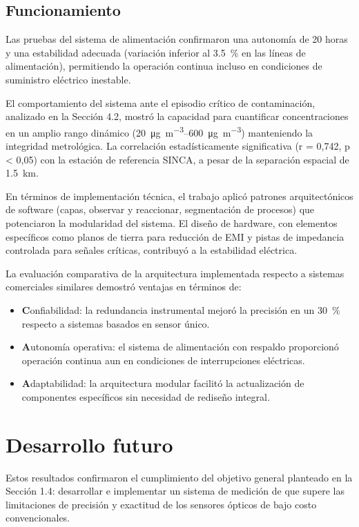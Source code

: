 \subsection*{Funcionamiento}
Las pruebas del sistema de alimentación confirmaron una autonomía de 20 horas y una estabilidad adecuada (variación inferior al \SI{3.5}{\percent} en las líneas de alimentación), permitiendo la operación continua incluso en condiciones de suministro eléctrico inestable.

El comportamiento del sistema ante el episodio crítico de contaminación, analizado en la Sección 4.2, mostró la capacidad para cuantificar concentraciones en un amplio rango dinámico (\SIrange{20}{600}{\micro\gram\per\cubic\meter}) manteniendo la integridad metrológica. La correlación estadísticamente significativa (r = 0,742, p < 0,05) con la estación de referencia SINCA, a pesar de la separación espacial de \SI{1.5}{\kilo\meter}.

En términos de implementación técnica, el trabajo aplicó patrones arquitectónicos de software (capas, observar y reaccionar, segmentación de procesos) que potenciaron la modularidad del sistema. El diseño de hardware, con elementos específicos como planos de tierra para reducción de EMI y pistas de impedancia controlada para señales críticas, contribuyó a la estabilidad eléctrica.

La evaluación comparativa de la arquitectura implementada respecto a sistemas comerciales similares demostró ventajas en términos de:

\begin{itemize}
	\item \textbf Confiabilidad: la redundancia instrumental mejoró la precisión en un \SI{30}{\percent} respecto a sistemas basados en sensor único.
	\item \textbf Autonomía operativa: el sistema de alimentación con respaldo proporcionó operación continua aun en condiciones de interrupciones eléctricas.
	\item \textbf Adaptabilidad: la arquitectura modular facilitó la actualización de componentes específicos sin necesidad de rediseño integral.
\end{itemize}

\section{Desarrollo futuro}

Estos resultados confirmaron el cumplimiento del objetivo general planteado en la Sección 1.4: desarrollar e implementar un sistema de medición de \MPF que supere las limitaciones de precisión y exactitud de los sensores ópticos de bajo costo convencionales.

